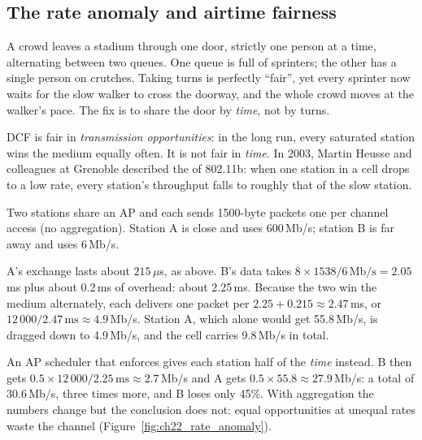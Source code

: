 \subsection{The rate anomaly and airtime fairness}

\begin{analogy}
A crowd leaves a stadium through one door, strictly one person at a time, alternating between two
queues. One queue is full of sprinters; the other has a single person on crutches. Taking turns is
perfectly ``fair'', yet every sprinter now waits for the slow walker to cross the doorway, and the
whole crowd moves at the walker's pace. The fix is to share the door by \emph{time}, not by turns.
\end{analogy}

DCF is fair in \emph{transmission opportunities}: in the long run, every saturated station wins the
medium equally often. It is not fair in \emph{time}. In 2003, Martin Heusse and colleagues at
Grenoble described the  of 802.11b: when one station in a cell drops to a
low rate, every station's throughput falls to roughly that of the slow station.


\begin{worked}
Two stations share an AP and each sends 1500-byte packets one per channel access (no aggregation).
Station A is close and uses 600\,Mb/s; station B is far away and uses 6\,Mb/s.

A's exchange lasts about $215\,\mu$s, as above. B's data takes $8\times1538/6\,\text{Mb/s}=2.05$\,ms
plus about 0.2\,ms of overhead: about 2.25\,ms. Because the two win the medium alternately, each
delivers one packet per $2.25+0.215\approx2.47$\,ms, or $12\,000/2.47\,\text{ms}\approx4.9$\,Mb/s.
Station A, which alone would get 55.8\,Mb/s, is dragged down to 4.9\,Mb/s, and the cell carries
9.8\,Mb/s in total.

An AP scheduler that enforces  gives each station half of the \emph{time}
instead. B then gets $0.5\times12\,000/2.25\,\text{ms}\approx2.7$\,Mb/s and A gets
$0.5\times55.8\approx27.9$\,Mb/s: a total of 30.6\,Mb/s, three times more, and B loses only 45\%. With
aggregation the numbers change but the conclusion does not: equal opportunities at unequal rates
waste the channel (Figure~\ref{fig:ch22_rate_anomaly}).
\end{worked}

